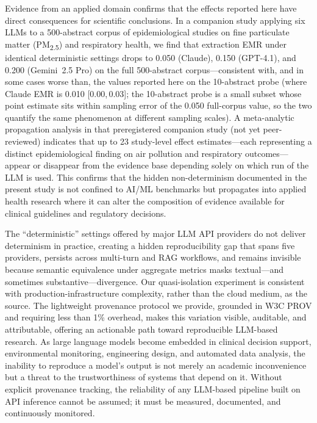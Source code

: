 \documentclass[sn-nature]{sn-jnl}
\begin{document}
Evidence from an applied domain confirms that the effects reported here have direct consequences for scientific conclusions.
In a companion study applying six LLMs to a 500-abstract corpus of epidemiological studies on fine particulate matter (PM\textsubscript{2.5}) and respiratory health\cite{rover2026evidence}, we find that extraction EMR under identical deterministic settings drops to 0.050 (Claude), 0.150 (GPT-4.1), and 0.200 (Gemini~2.5 Pro) on the full 500-abstract corpus---consistent with, and in some cases worse than, the values reported here on the 10-abstract probe (where Claude EMR is 0.010 [0.00,\,0.03]; the 10-abstract probe is a small subset whose point estimate sits within sampling error of the 0.050 full-corpus value, so the two quantify the same phenomenon at different sampling scales).
A meta-analytic propagation analysis in that preregistered companion study (not yet peer-reviewed) indicates that up to 23 study-level effect estimates---each representing a distinct epidemiological finding on air pollution and respiratory outcomes---appear or disappear from the evidence base depending solely on which run of the LLM is used.
This confirms that the hidden non-determinism documented in the present study is not confined to AI/ML benchmarks but propagates into applied health research where it can alter the composition of evidence available for clinical guidelines and regulatory decisions.

The ``deterministic'' settings offered by major LLM API providers do not deliver determinism in practice, creating a hidden reproducibility gap that spans five providers, persists across multi-turn and RAG workflows, and remains invisible because semantic equivalence under aggregate metrics masks textual---and sometimes substantive---divergence.
Our quasi-isolation experiment is consistent with production-infrastructure complexity, rather than the cloud medium, as the source.
The lightweight provenance protocol we provide, grounded in W3C PROV and requiring less than 1\% overhead, makes this variation visible, auditable, and attributable, offering an actionable path toward reproducible LLM-based research.
As large language models become embedded in clinical decision support, environmental monitoring, engineering design, and automated data analysis, the inability to reproduce a model's output is not merely an academic inconvenience but a threat to the trustworthiness of systems that depend on it.
Without explicit provenance tracking, the reliability of any LLM-based pipeline built on API inference cannot be assumed; it must be measured, documented, and continuously monitored.
\end{document}

